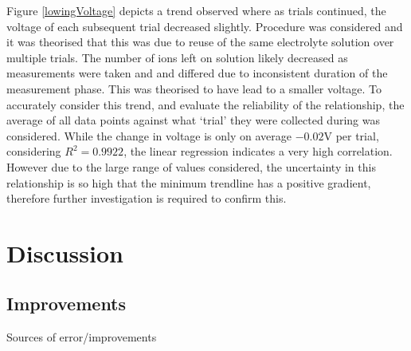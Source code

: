 \documentclass[11pt,a4paper]{article}
\begin{document}
Figure \ref{lowingVoltage} depicts a trend observed where as trials continued, the voltage of each subsequent trial decreased slightly. Procedure was considered and it was theorised that this was due to reuse of the same electrolyte solution over multiple trials. The number of ions left on solution likely decreased as measurements were taken and and differed due to inconsistent duration of the measurement phase. This was theorised to have lead to a smaller voltage. To accurately consider this trend, and evaluate the reliability of the relationship, the average of all data points against what `trial' they were collected during was considered. While the change in voltage is only on average $-0.02$V per trial, considering $R^2=0.9922$, the linear regression indicates a very high correlation. However due to the large range of values considered, the uncertainty in this relationship is so high that the minimum trendline has a positive gradient, therefore further investigation is required to confirm this. 






\section{Discussion}

\subsection{Improvements}
Sources of error/improvements
\end{document}
